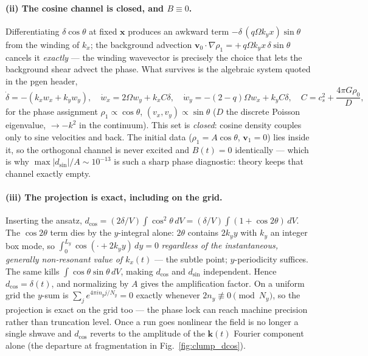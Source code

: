 \documentclass[11pt]{article}
\begin{document}
\paragraph{(ii) The cosine channel is closed, and $B \equiv 0$.}
Differentiating $\delta\cos\theta$ at fixed $\mathbf{x}$ produces an awkward
term $-\delta\,(q\Omega k_y x)\sin\theta$ from the winding of $k_x$; the
background advection $\mathbf{v}_0\!\cdot\!\nabla\rho_1 =
+\,q\Omega k_y x\,\delta\sin\theta$ cancels it \emph{exactly} --- the winding
wavevector is precisely the choice that lets the background shear advect the
phase. What survives is the algebraic system quoted in the pgen header,
\begin{equation}
\dot\delta = -(k_x w_x + k_y w_y),\quad
\dot w_x = 2\Omega w_y + k_x C\delta,\quad
\dot w_y = -(2{-}q)\Omega w_x + k_y C\delta,\quad
C = c_s^2 + \frac{4\pi G\rho_0}{D},
\end{equation}
for the phase assignment $\rho_1\!\propto\!\cos\theta$,
$(v_x,v_y)\!\propto\!\sin\theta$ ($D$ the discrete Poisson eigenvalue,
$\to -k^2$ in the continuum). This set is \emph{closed}: cosine density
couples only to sine velocities and back. The initial data
($\rho_1 = A\cos\theta$, $\mathbf{v}_1=0$) lies inside it, so the orthogonal
channel is never excited and $B(t)=0$ identically --- which is why
$\max|d_{\sin}|/A \sim 10^{-13}$ is such a sharp phase diagnostic: theory
keeps that channel exactly empty.

\paragraph{(iii) The projection is exact, including on the grid.}
Inserting the ansatz, $d_{\cos} = (2\delta/V)\!\int\!\cos^2\theta\,dV =
(\delta/V)\!\int(1+\cos2\theta)\,dV$. The $\cos2\theta$ term dies by the
$y$-integral alone: $2\theta$ contains $2k_y y$ with $k_y$ an integer box
mode, so $\int_0^{L_y}\!\cos(\cdot+2k_y y)\,dy = 0$ \emph{regardless of the
instantaneous, generally non-resonant value of $k_x(t)$} --- the subtle
point; $y$-periodicity suffices. The same kills
$\int\cos\theta\sin\theta\,dV$, making $d_{\cos}$ and $d_{\sin}$ independent.
Hence $d_{\cos} = \delta(t)$, and normalizing by $A$ gives the amplification
factor. On a uniform grid the $y$-sum is
$\sum_j e^{4\pi i n_y j/N_y} = 0$ exactly whenever
$2n_y \not\equiv 0 \pmod{N_y}$, so the projection is exact on the grid too
--- the phase lock can reach machine precision rather than truncation level.
Once a run goes nonlinear the field is no longer a single shwave and
$d_{\cos}$ reverts to the amplitude of the $\mathbf{k}(t)$ Fourier component
alone (the departure at fragmentation in Fig.~\ref{fig:clump_dcos}).
\end{document}
